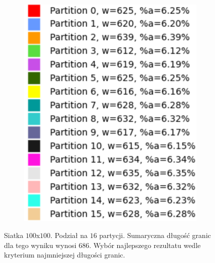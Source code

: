 \begin{figure}[h]
\centering
\begin{subfigure}{.5\textwidth}
    \centering
    \caption[short]{}
\end{subfigure}%
\begin{subfigure}{.5\textwidth}
    \centering
    \includegraphics[width=0.6\linewidth]{images/results/m_k/without/1/results}
    \caption[short]{}
\end{subfigure}
\caption{Siatka $100$x$100$. Podział na $16$ partycji. Sumaryczna długość granic dla tego wyniku wynosi $686$.
Wybór najlepszego rezultatu wedle kryterium najmniejszej długości granic. }
\label{result:w1}
\end{figure}
